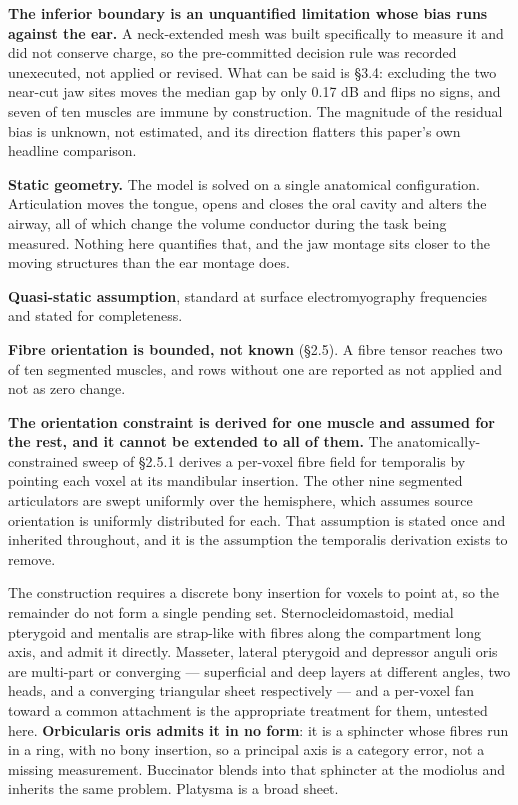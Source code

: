 \documentclass[
  11pt,
  letterpaper,
]{article}
\begin{document}
\textbf{The inferior boundary is an unquantified limitation whose bias runs against
the ear.} A neck-extended mesh was built specifically to measure it and did not
conserve charge, so the pre-committed decision rule was recorded unexecuted, not
applied or revised. What can be said is §3.4: excluding the two near-cut jaw
sites moves the median gap by only \textminus{}0.17 dB and flips no signs, and seven of ten
muscles are immune by construction. The magnitude of the residual bias is
unknown, not estimated, and its direction flatters this paper's own headline
comparison.

\textbf{Static geometry.} The model is solved on a single anatomical configuration.
Articulation moves the tongue, opens and closes the oral cavity and alters the
airway, all of which change the volume conductor during the task being measured.
Nothing here quantifies that, and the jaw montage sits closer to the moving
structures than the ear montage does.

\textbf{Quasi-static assumption}, standard at surface electromyography frequencies
and stated for completeness.

\textbf{Fibre orientation is bounded, not known} (§2.5). A fibre tensor reaches two
of ten segmented muscles, and rows without one are reported as not applied and
not as zero change.

\textbf{The orientation constraint is derived for one muscle and assumed for the rest,
and it cannot be extended to all of them.} The anatomically-constrained sweep of
§2.5.1 derives a per-voxel fibre field for temporalis by pointing each voxel at
its mandibular insertion. The other nine segmented articulators are swept
uniformly over the hemisphere, which assumes source orientation is uniformly
distributed for each. That assumption is stated once and inherited throughout,
and it is the assumption the temporalis derivation exists to remove.

The construction requires a discrete bony insertion for voxels to point at, so
the remainder do not form a single pending set. Sternocleidomastoid, medial
pterygoid and mentalis are strap-like with fibres along the compartment long
axis, and admit it directly. Masseter, lateral pterygoid and depressor anguli
oris are multi-part or converging --- superficial and deep layers at different
angles, two heads, and a converging triangular sheet respectively --- and a
per-voxel fan toward a common attachment is the appropriate treatment for them,
untested here. \textbf{Orbicularis oris admits it in no form}: it is a sphincter
whose fibres run in a ring, with no bony insertion, so a principal axis is a
category error, not a missing measurement. Buccinator blends into that sphincter
at the modiolus and inherits the same problem. Platysma is a broad sheet.
\end{document}

